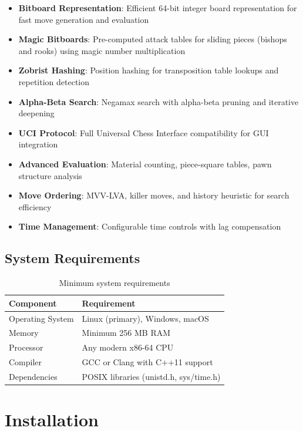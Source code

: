 \documentclass[11pt,a4paper]{report}
\begin{document}
\begin{itemize}
    \item \textbf{Bitboard Representation}: Efficient 64-bit integer board representation for fast move generation and evaluation
    \item \textbf{Magic Bitboards}: Pre-computed attack tables for sliding pieces (bishops and rooks) using magic number multiplication
    \item \textbf{Zobrist Hashing}: Position hashing for transposition table lookups and repetition detection
    \item \textbf{Alpha-Beta Search}: Negamax search with alpha-beta pruning and iterative deepening
    \item \textbf{UCI Protocol}: Full Universal Chess Interface compatibility for GUI integration
    \item \textbf{Advanced Evaluation}: Material counting, piece-square tables, pawn structure analysis
    \item \textbf{Move Ordering}: MVV-LVA, killer moves, and history heuristic for search efficiency
    \item \textbf{Time Management}: Configurable time controls with lag compensation
\end{itemize}

\section{System Requirements}

\begin{table}[h]
\centering
\begin{tabular}{ll}
\toprule
\textbf{Component} & \textbf{Requirement} \\
\midrule
Operating System & Linux (primary), Windows, macOS \\
Memory & Minimum 256 MB RAM \\
Processor & Any modern x86-64 CPU \\
Compiler & GCC or Clang with C++11 support \\
Dependencies & POSIX libraries (unistd.h, sys/time.h) \\
\bottomrule
\end{tabular}
\caption{Minimum system requirements}
\end{table}

\chapter{Installation}
\end{document}
